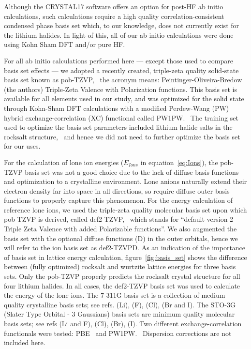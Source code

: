 \documentclass[titlepage,11pt]{article}
\begin{document}

Although the CRYSTAL17 software offers an option for post-HF ab initio calculations, such calculations require a high quality correlation-consistent condensed phase basis set which, to our knowledge, does not currently exist for the lithium halides. In light of this, all of our ab initio calculations were done using Kohn Sham DFT and/or pure HF.

For all ab initio calculations performed here --- except those used to compare basis set effects --- we adopted a recently created, triple-zeta quality solid-state basis set known as pob-TZVP,~\cite{Peintinger2013,Laun2018} the acronym means: Peintinger-Oliveira-Bredow (the authors) Triple-Zeta Valence with Polarization functions. This basis set is available for all elements used in our study, and was optimized for the solid state through Kohn-Sham DFT calculations with a modified Perdew-Wang (PW) hybrid exchange-correlation (XC) functional called PW1PW.~\cite{PW1PW} The training set used to optimize the basis set parameters included lithium halide salts in the rocksalt structure,~\cite{Peintinger2013} and hence we did not need to further optimize the basis set for our uses.

For the calculation of lone ion energies ($E_{Ions}$ in equation~\ref{eq:Ions}), the pob-TZVP basis set was not a good choice due to the lack of diffuse basis functions and optimization to a crystalline environment. Lone anions naturally extend their electron density far into space in all directions, so require diffuse outer basis functions to properly capture this phenomenon. For the energy calculation of reference lone ions, we used the triple-zeta quality molecular basis set upon which pob-TZVP is derived, called def2-TZVP,~\cite{Rappoport2010,Peintinger2013} which stands for ``default version 2 - Triple Zeta Valence with added Polarizable functions''. We also augmented the basis set with the optional diffuse functions (D) in the outer orbitals, hence we will refer to the ion basis set as def2-TZVPD. As an indication of the importance of basis set in lattice energy calculation, figure~\ref{fig:basis_set} shows the difference between (fully optimized) rocksalt and wurtzite lattice energies for three basis sets. Only the pob-TZVP properly predicts the rocksalt crystal structure for all four lithium halides. In all cases, the def2-TZVP basis set was used to calculate the energy of the lone ions. The 7-311G basis set is a collection of medium quality crystalline basis sets; see refs.  (Li),  (F),  (Cl),  (Br and I). The STO-3G (Slater Type Orbital - 3 Gaussians) basis sets are minimum quality molecular basis sets; see refs  (Li and F),  (Cl),  (Br),  (I). Two different exchange-correlation functionals were tested: PBE~\cite{Perdew1996} and PW1PW.~\cite{PW1PW} Dispersion corrections are not included here.
\end{document}
